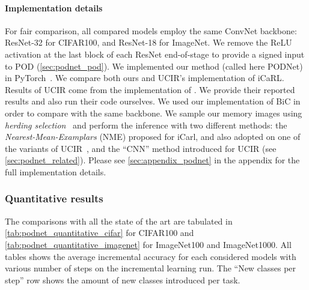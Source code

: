 \paragraph{Implementation details} For fair comparison, all compared models employ the same ConvNet
backbone: ResNet-32 for CIFAR100, and ResNet-18 for ImageNet. We remove the ReLU activation at the
last block of each ResNet end-of-stage to provide a signed input to POD
(\autoref{sec:podnet_pod}). We implemented our method (called here PODNet) in
PyTorch~\citep{paszke2017pytorch}.
%
We compare both ours and UCIR's implementation of iCaRL. Results of UCIR come
from the implementation of \cite{hou2019ucir}. We provide their reported results and
also run their code ourselves. We used our implementation of BiC \citep{wu2019bias_correction} in order to compare with the same
backbone.
%
We sample our memory images using \textit{herding selection}~\citep{rebuffi2017icarl} and perform
the inference with two different methods: the \textit{Nearest-Mean-Examplars} (NME) proposed for
iCarl, and also adopted on one of the variants of UCIR~\citep{hou2019ucir}, and the ``CNN'' method
introduced for UCIR (see \autoref{sec:podnet_related}).
%
Please see \autoref{sec:appendix_podnet} in the appendix for the full implementation details.




\subsubsection{Quantitative results}
\label{sec:podnet_quantitative_results}

The comparisons with all the state of the art are tabulated in
\autoref{tab:podnet_quantitative_cifar} for CIFAR100 and \autoref{tab:podnet_quantitative_imagenet}
for ImageNet100 and ImageNet1000. All tables shows the average incremental accuracy for each
considered models with various number of steps on the incremental learning run. The ``New classes
per step'' row shows the amount of new classes introduced per task.

